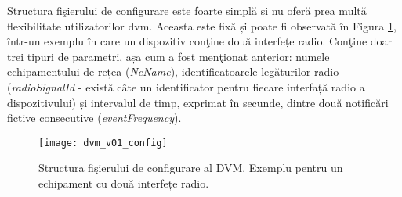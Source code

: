 Structura fişierului de configurare este foarte simplă și nu oferă prea multă flexibilitate utilizatorilor \gls{dvm}. Aceasta este fixă și poate fi observată în Figura \ref{fig:dvm_v01_config}, într-un exemplu în care un dispozitiv conţine două interfețe radio. Conţine doar trei tipuri de parametri, așa cum a fost menţionat anterior: numele echipamentului de rețea (\textit{NeName}), identificatoarele legăturilor radio (\textit{radioSignalId} - există câte un identificator pentru fiecare interfață radio a dispozitivului) și intervalul de timp, exprimat în secunde, dintre două notificări fictive consecutive (\textit{eventFrequency}).

\begin{figure}[h]
	\centering
	\texttt{[image: dvm\_v01\_config]}
	\caption{Structura fişierului de configurare al DVM. Exemplu pentru un echipament cu două interfețe radio.}
	\label{fig:dvm_v01_config}
\end{figure}